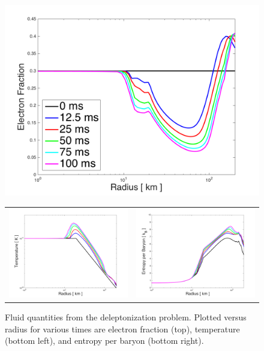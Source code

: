 \documentclass[10pt,preprint]{aastex}
\begin{document}
\begin{figure}
  \begin{center}
	\includegraphics[width=.85\textwidth]{./Figures/DeleptonizationProblem1D_ElectronFraction.png}
	\begin{tabular}{cc}
	  \includegraphics[width=.475\textwidth]{./Figures/DeleptonizationProblem1D_Temperature.png} &
	  \includegraphics[width=.475\textwidth]{./Figures/DeleptonizationProblem1D_EntropyPerBaryon.png}
	\end{tabular}
  \end{center}
  \caption{Fluid quantities from the deleptonization problem.  Plotted versus radius for various times are electron fraction (top), temperature (bottom left), and entropy per baryon (bottom right).}
  \label{fig:}
\end{figure}
\end{document}
